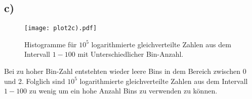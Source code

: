 \subsection{c)}
\label{subsec:a2c}

\begin{figure}
  \centering
  \texttt{[image: plot2c).pdf]}
  \caption{Histogramme für $10^5$ logarithmierte gleichverteilte Zahlen aus
  dem Intervall $1-100$ mit Unterschiedlicher Bin-Anzahl.}
  \label{fig:c}
\end{figure}
\FloatBarrier

Bei zu hoher Bin-Zahl entstehten wieder leere Bins in dem Bereich zwischen 0 und 2.
Folglich sind $10^5$ logarithmierte gleichverteilte Zahlen aus
dem Intervall $1-100$ zu wenig um ein hohe Anzahl Bins zu verwenden zu können.
